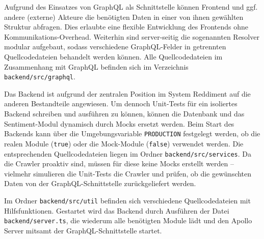 \documentclass[a4paper, 10pt, conference]{IEEEtran}
\begin{document}
Aufgrund des Einsatzes von GraphQL als Schnittstelle können Frontend und ggf. andere (externe) Akteure die benötigten Daten in einer von ihnen gewählten Struktur abfragen. Dies erlaubte eine flexible Entwicklung des Frontends ohne Kommunikations-Overhead. Weiterhin sind server-seitig die sogenannten Resolver modular aufgebaut, sodass verschiedene GraphQL-Felder in getrennten Quellcodedateien behandelt werden können. Alle Quellcodedateien im Zusammenhang mit GraphQL befinden sich im Verzeichnis \texttt{backend/src/graphql}.

Das Backend ist aufgrund der zentralen Position im System Reddiment auf die anderen Bestandteile angewiesen. Um dennoch Unit-Tests für ein isoliertes Backend schreiben und ausführen zu können, können die Datenbank und das Sentiment-Modul dynamisch durch Mocks ersetzt werden. Beim Start des Backends kann über die Umgebungsvariable \texttt{PRODUCTION} festgelegt werden, ob die realen Module (\texttt{true}) oder die Mock-Module (\texttt{false}) verwendet werden. Die entsprechenden Quellcodedateien liegen im Ordner \texttt{backend/src/services}. Da die Crawler proaktiv sind, müssen für diese keine Mocks erstellt werden -- vielmehr simulieren die Unit-Tests die Crawler und prüfen, ob die gewünschten Daten von der GraphQL-Schnittstelle zurückgeliefert werden.

Im Ordner \texttt{backend/src/util} befinden sich verschiedene Quellcodedateien mit Hilfsfunktionen. Gestartet wird das Backend durch Ausführen der Datei \texttt{backend/server.ts}, die wiederum alle benötigten Module lädt und den Apollo Server mitsamt der GraphQL-Schnittstelle startet.
\end{document}
